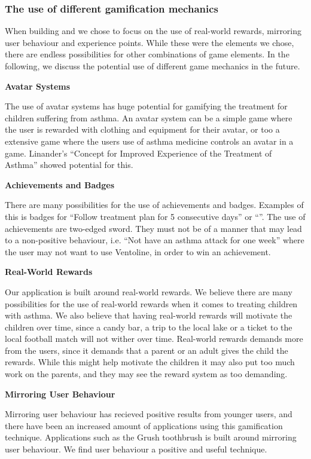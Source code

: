 \subsubsection{The use of different gamification mechanics}
\label{sec:gamificationinthefuture}
When building \app{} and \ab{} we chose to focus on the use of real-world rewards, mirroring user behaviour and experience points. While these were the elements we chose, there are endless possibilities for other combinations of game elements. In the following, we discuss the potential use of different game mechanics in the future.

\textbf{Avatar Systems}

The use of avatar systems has huge potential for gamifying the treatment for children suffering from asthma. An avatar system can be a simple game where the user is rewarded with clothing and equipment for their avatar, or too a extensive game where the users use of asthma medicine controls an avatar in a game. Linander's ``Concept for Improved Experience of the Treatment of Asthma''\cite{linander2013utvikling} showed potential for this.

\textbf{Achievements and Badges}

There are many possibilities for the use of achievements and badges. Examples of this is badges for ``Follow treatment plan for 5 consecutive days'' or ``''. The use of achievements are two-edged sword. They must not be of a manner that may lead to a non-positive behaviour, i.e. ``Not have an asthma attack for one week'' where the user may not want to use Ventoline, in order to win an achievement. 

\textbf{Real-World Rewards}

Our application is built around real-world rewards. We believe there are many possibilities for the use of real-world rewards when it comes to treating children with asthma. We also believe that having real-world rewards will motivate the children over time, since a candy bar, a trip to the local lake or a ticket to the local football match will not wither over time. 
Real-world rewards demands more from the users, since it demands that a parent or an adult gives the child the rewards. While this might help motivate the children it may also put too much work on the parents, and they may see the reward system as too demanding.

\textbf{Mirroring User Behaviour}

Mirroring user behaviour has recieved positive results from younger users, and there have been an increased amount of applications using this gamification technique. Applications such as the Grush toothbrush is built around mirroring user behaviour. 
We find user behaviour a positive and useful technique.

